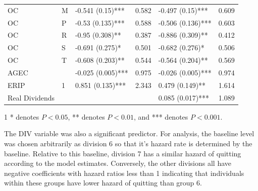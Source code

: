 \documentclass[12pt,letterpaper]{article}
\begin{document}
\begin{table}[htbp]
\begin{threeparttable}
\begin{tabular}{llL{2.5cm}L{1.5cm}L{2.5cm}L{1.5cm}}
			OC  & M     & -0.541 (0.15)*** & 0.582 & -0.497 (0.15)*** & 0.609 \\
			OC  & P     & -0.53 (0.135)*** & 0.588 & -0.506 (0.136)*** & 0.603 \\
			OC  & R     & -0.95 (0.308)** & 0.387 & -0.886 (0.309)** & 0.412 \\
			OC  & S     & -0.691 (0.275)* & 0.501 & -0.682 (0.276)* & 0.506 \\
			OC  & T     & -0.608 (0.203)** & 0.544 & -0.564 (0.204)** & 0.569 \\
			AGEC &       & -0.025 (0.005)*** & 0.975 & -0.026 (0.005)*** & 0.974 \\
			ERIP  & 1     & 0.851 (0.135)*** & 2.343 & 0.479 (0.149)** & 1.614 \\
			Real Dividends &       &       &       & 0.085 (0.017)*** & 1.089 \\
			\bottomrule
		\end{tabular}%
		\begin{tablenotes}
			\item[1] * denotes $P<0.05$, ** denotes $P<0.01$, and *** denotes $P<0.001$.
		\end{tablenotes}
		
	\end{threeparttable}
	\label{tab:vqparaest}%
\end{table}
The DIV variable was also a significant predictor.  For analysis, the baseline level was chosen arbitrarily as division 6 so that it's hazard rate is determined by the baseline.  Relative to this baseline, division 7 has a similar hazard of quitting according to the model estimates. Conversely, the other divisions all have negative coefficients with hazard ratios less than 1 indicating that individuals within these groups have lower hazard of quitting than group 6.
\end{document}
